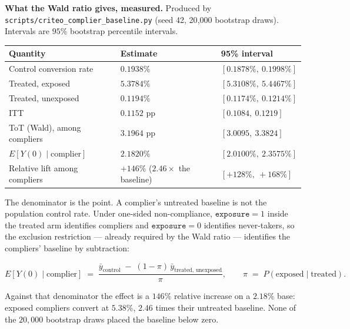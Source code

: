 \documentclass[11pt,a4paper]{article}
\begin{document}
\begin{keybox}
\textbf{What the Wald ratio gives, measured.} Produced by
\texttt{scripts/criteo\_complier\_baseline.py} (seed 42, 20{,}000 bootstrap draws). Intervals are
$95\%$ bootstrap percentile intervals.

\medskip

\begin{tabularx}{\textwidth}{@{}L{7.0cm}L{2.6cm}X@{}}
\toprule
\textbf{Quantity} & \textbf{Estimate} & \textbf{95\% interval} \\
\midrule
Control conversion rate & $0.1938\%$ & $[0.1878\%,\ 0.1998\%]$ \\
Treated, exposed & $5.3784\%$ & $[5.3108\%,\ 5.4467\%]$ \\
Treated, unexposed & $0.1194\%$ & $[0.1174\%,\ 0.1214\%]$ \\
ITT & $0.1152$ pp & $[0.1084,\ 0.1219]$ \\
ToT (Wald), among compliers & $3.1964$ pp & $[3.0095,\ 3.3824]$ \\
$E[Y(0) \mid \text{complier}]$ & $2.1820\%$ & $[2.0100\%,\ 2.3575\%]$ \\
\midrule
Relative lift among compliers & $+146\%$ ($2.46\times$ the baseline) & $[+128\%,\ +168\%]$ \\
\bottomrule
\end{tabularx}

\medskip

The denominator is the point. A complier's untreated baseline is not the population control rate.
Under one-sided non-compliance, $\texttt{exposure}=1$ inside the treated arm identifies compliers
and $\texttt{exposure}=0$ identifies never-takers, so the exclusion restriction --- already required
by the Wald ratio --- identifies the compliers' baseline by subtraction:

\[
E[Y(0) \mid \text{complier}] \;=\;
\frac{\bar{y}_{\text{control}} \;-\; (1-\pi)\,\bar{y}_{\text{treated, unexposed}}}{\pi},
\qquad \pi \;=\; P(\text{exposed} \mid \text{treated}).
\]

Against that denominator the effect is a $146\%$ relative increase on a $2.18\%$ base: exposed
compliers convert at $5.38\%$, $2.46$ times their untreated baseline. None of the $20{,}000$
bootstrap draws placed the baseline below zero.
\end{keybox}
\end{document}
